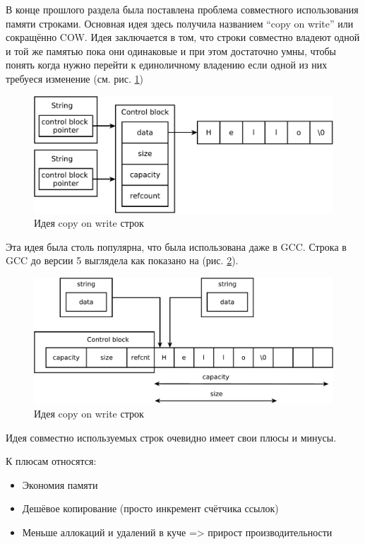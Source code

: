 \documentclass[a4paper,12pt,oneside]{article}
\begin{document}
В конце прошлого раздела была поставлена проблема совместного использования памяти строками. Основная идея здесь получила названием ``copy on write'' или сокращённо COW. Идея заключается в том, что строки совместно владеют одной и той же памятью пока они одинаковые и при этом достаточно умны, чтобы понять когда нужно перейти к единоличному владению если одной из них требуеся изменение (см. рис. \ref{fig:principal-cow})

\begin{figure}[ht]
\centering
\includegraphics[width=1.0\textwidth]{illustrations/cow-principal-crop.pdf}
\caption{Идея copy on write строк}
\label{fig:principal-cow}
\end{figure}

Эта идея была столь популярна, что была использована даже в GCC. Строка в GCC до версии 5 выглядела как показано на (рис. \ref{fig:string-cow-gcc}).

\begin{figure}[ht]
\centering
\includegraphics[width=1.0\textwidth]{illustrations/string-cow-gcc-crop.pdf}
\caption{Идея copy on write строк}
\label{fig:string-cow-gcc}
\end{figure}

Идея совместно используемых строк очевидно имеет свои плюсы и минусы.

К плюсам относятся:

\begin{itemize}
\item Экономия памяти
\item Дешёвое копирование (просто инкремент счётчика ссылок)
\item Меньше аллокаций и удалений в куче => прирост производительности
\end{itemize}
\end{document}
